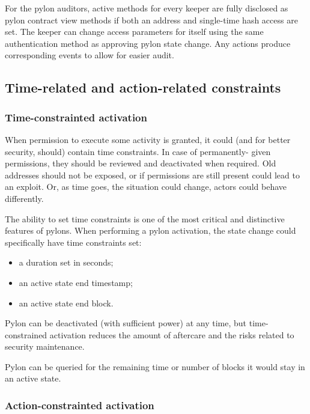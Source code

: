\documentclass[12pt]{article}
\begin{document}
For the pylon auditors, active methods for every keeper are fully disclosed as pylon contract view methods if both an address and single-time hash access are set. The keeper can change access parameters for itself using the same authentication method as approving pylon state change. Any actions produce corresponding events to allow for easier audit.

\bigskip
\subsection{Time-related and action-related constraints}
\label{constraints}

\subsubsection{Time-constrainted activation}

When permission to execute some activity is granted, it could (and for better security, should) contain time constraints. In case of permanently- given permissions, they should be reviewed and deactivated when required. Old addresses should not be exposed, or if permissions are still present could lead to an exploit. Or, as time goes, the situation could change, actors could behave differently.


The ability to set time constraints is one of the most critical and distinctive features of pylons. When performing a pylon activation, the state change could specifically have time constraints set:
\begin{itemize}
\item{a duration set in seconds;}
\item{an active state end timestamp;}
\item{an active state end block.}
\end{itemize}


Pylon can be deactivated (with sufficient power) at any time, but time-constrained activation reduces the amount of aftercare and the risks related to security maintenance.

Pylon can be queried for the remaining time or number of blocks it would stay in an active state.


\subsubsection{Action-constrainted activation}
\end{document}
